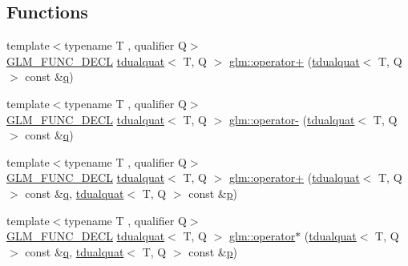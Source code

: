 \subsection*{Functions}
\begin{DoxyCompactItemize}
\item 
{\footnotesize template$<$typename T , qualifier Q$>$ }\\\mbox{\hyperlink{setup_8hpp_ab2d052de21a70539923e9bcbf6e83a51}{G\+L\+M\+\_\+\+F\+U\+N\+C\+\_\+\+D\+E\+CL}} \mbox{\hyperlink{structglm_1_1tdualquat}{tdualquat}}$<$ T, Q $>$ \mbox{\hyperlink{group__gtx__dual__quaternion_ga11a89ba9d2bc5ef4ab9bd77ac231fe63}{glm\+::operator+}} (\mbox{\hyperlink{structglm_1_1tdualquat}{tdualquat}}$<$ T, Q $>$ const \&\mbox{\hyperlink{_s_d_l__opengl_8h_a8fc1e7b9baaae687804c7eed46ca09c6}{q}})
\item 
{\footnotesize template$<$typename T , qualifier Q$>$ }\\\mbox{\hyperlink{setup_8hpp_ab2d052de21a70539923e9bcbf6e83a51}{G\+L\+M\+\_\+\+F\+U\+N\+C\+\_\+\+D\+E\+CL}} \mbox{\hyperlink{structglm_1_1tdualquat}{tdualquat}}$<$ T, Q $>$ \mbox{\hyperlink{group__gtx__dual__quaternion_ga2245f8ea1b7c8a3fccfc92ca97ef03de}{glm\+::operator-\/}} (\mbox{\hyperlink{structglm_1_1tdualquat}{tdualquat}}$<$ T, Q $>$ const \&\mbox{\hyperlink{_s_d_l__opengl_8h_a8fc1e7b9baaae687804c7eed46ca09c6}{q}})
\item 
{\footnotesize template$<$typename T , qualifier Q$>$ }\\\mbox{\hyperlink{setup_8hpp_ab2d052de21a70539923e9bcbf6e83a51}{G\+L\+M\+\_\+\+F\+U\+N\+C\+\_\+\+D\+E\+CL}} \mbox{\hyperlink{structglm_1_1tdualquat}{tdualquat}}$<$ T, Q $>$ \mbox{\hyperlink{group__gtx__dual__quaternion_ga55e10eaaabe1166be6314df62591c134}{glm\+::operator+}} (\mbox{\hyperlink{structglm_1_1tdualquat}{tdualquat}}$<$ T, Q $>$ const \&\mbox{\hyperlink{_s_d_l__opengl_8h_a8fc1e7b9baaae687804c7eed46ca09c6}{q}}, \mbox{\hyperlink{structglm_1_1tdualquat}{tdualquat}}$<$ T, Q $>$ const \&\mbox{\hyperlink{_s_d_l__opengl__glext_8h_aa5367c14d90f462230c2611b81b41d23}{p}})
\item 
{\footnotesize template$<$typename T , qualifier Q$>$ }\\\mbox{\hyperlink{setup_8hpp_ab2d052de21a70539923e9bcbf6e83a51}{G\+L\+M\+\_\+\+F\+U\+N\+C\+\_\+\+D\+E\+CL}} \mbox{\hyperlink{structglm_1_1tdualquat}{tdualquat}}$<$ T, Q $>$ \mbox{\hyperlink{group__gtx__dual__quaternion_ga01828eee9e1cf1f56e4018fcdc910aa0}{glm\+::operator$\ast$}} (\mbox{\hyperlink{structglm_1_1tdualquat}{tdualquat}}$<$ T, Q $>$ const \&\mbox{\hyperlink{_s_d_l__opengl_8h_a8fc1e7b9baaae687804c7eed46ca09c6}{q}}, \mbox{\hyperlink{structglm_1_1tdualquat}{tdualquat}}$<$ T, Q $>$ const \&\mbox{\hyperlink{_s_d_l__opengl__glext_8h_aa5367c14d90f462230c2611b81b41d23}{p}})

\end{DoxyCompactItemize}

